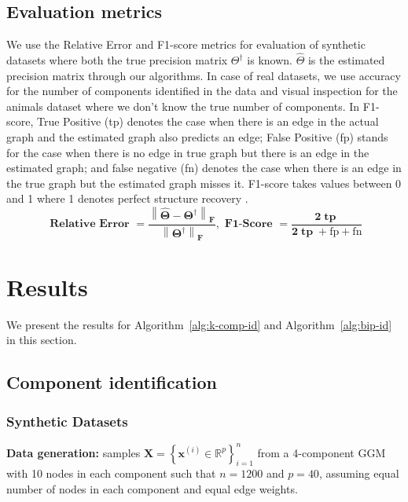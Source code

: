 \subsection{Evaluation metrics}
We use the Relative Error and F1-score metrics for evaluation of synthetic datasets where both the true precision matrix $\Theta^{\dagger}$ is known. $\hat{\Theta}$ is the estimated precision matrix through our algorithms. In case of real datasets, we use accuracy for the number of components identified in the data and visual inspection for the animals dataset where we don't know the true number of components. In F1-score, True Positive (tp) denotes the case when there is an edge in the actual graph and the estimated graph also predicts an edge; False Positive (fp) stands for the case when there is no edge in true graph but there is an edge in the estimated graph; and false negative (fn) denotes the case when there is an edge in the true graph but the estimated graph misses it. F1-score takes values between 0 and 1 where 1 denotes perfect structure recovery \citep{egilmez2016graph}.
$$
\mathbf{\text { Relative Error }=\frac{\left\|\hat{\Theta}-\Theta^{\dagger}\right\|_{F}}{\left\|\Theta^{\dagger}\right\|_{F}}, \text { F1-Score }=\frac{2 \operatorname{tp}}{2 \operatorname{tp}+\mathrm{fp}+\mathrm{fn}}}
$$

\section{Results}

We present the results for Algorithm~\ref{alg:k-comp-id} and Algorithm~\ref{alg:bip-id} in this section.
\subsection{Component identification}

\subsubsection{Synthetic Datasets}

\textbf{Data generation:} samples $\mathbf{X}=\left\{\mathbf{x}^{(i)} \in \mathbb{R}^{p}\right\}_{i=1}^{n}$ from a 4-component GGM with 10 nodes in each component such that $n=1200$ and $p=40$, assuming equal number of nodes in each component and equal edge weights.

